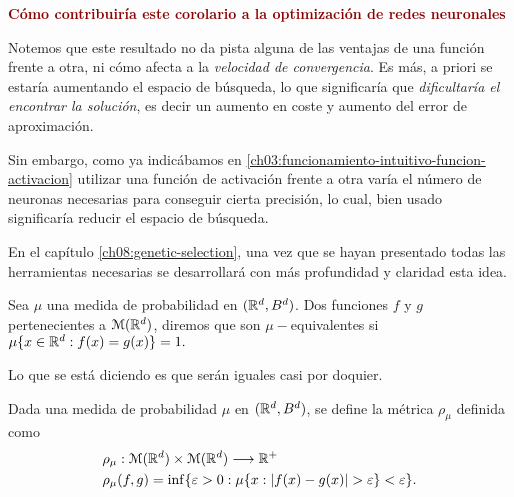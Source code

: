 \iconoClave  \textcolor{darkRed}{ \textbf{Cómo contribuiría este corolario a la optimización de redes neuronales}}

Notemos que este resultado no da pista alguna de las ventajas de una función frente a otra,
ni cómo afecta a la \textit{velocidad de convergencia}.
Es más, a priori se estaría aumentando el espacio de búsqueda, lo que significaría que \textit{dificultaría el encontrar la solución}, es decir
un aumento en coste y aumento del error de aproximación.

Sin embargo, como ya indicábamos en 
\ref{ch03:funcionamiento-intuitivo-funcion-activacion}
utilizar una función de activación frente a otra
varía el número de neuronas necesarias para 
conseguir cierta precisión, lo cual,
bien usado  significaría
reducir el espacio de búsqueda.

En el capítulo \ref{ch08:genetic-selection}, una vez que 
se hayan presentado todas las herramientas necesarias 
se desarrollará con más profundidad y claridad esta idea.


\begin{definicion} \label{definition:equivalencia_funciones}
    Sea $\mu$ una medida de probabilidad en $(\mathbb{R}^d, B^d)$.  Dos funciones 
    $f$ y $g$ pertenecientes a $\mathcal{M}(\mathbb{R}^d)$, diremos que son $\mu -$equivalentes 
    si $\mu\{ x \in \mathbb{R}^d : f(x)=g(x) \} = 1.$
\end{definicion}

Lo que se está diciendo es que serán iguales casi por doquier.   
\begin{definicion}  \label{definition:distancia-probabilidad}
    Dada una medida de probabilidad $\mu$ en $(\mathbb{R}^d, B^d)$, se define 
    la métrica $\rho_{\mu}$ definida como 
    \begin{equation}
        \begin{split}
            & \rho_{\mu} : \mathcal{M}(\mathbb{R}^d) \times \mathcal{M}(\mathbb{R}^d) \longrightarrow \mathbb{R}^+ \\
            & \rho_{\mu}(f,g) = \inf \{ \varepsilon > 0: \mu \{ x : |f(x) - g(x)| > \varepsilon \} < \varepsilon \}.
        \end{split}
    \end{equation}
\end{definicion}  

